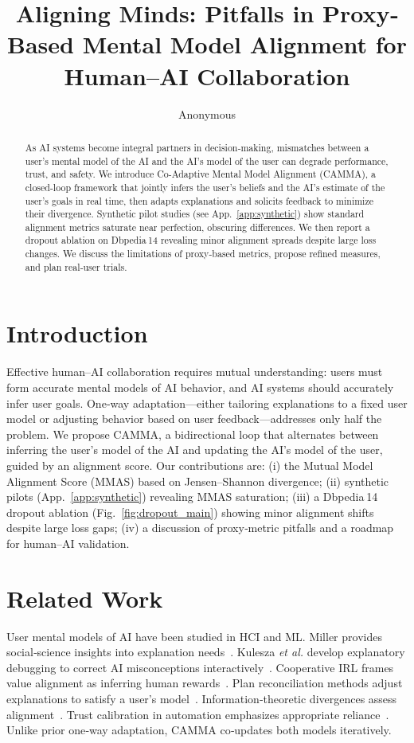 \documentclass{article}
\title{Aligning Minds: Pitfalls in Proxy‐Based Mental Model Alignment for Human–AI Collaboration}
\author{Anonymous}
\begin{document}
\maketitle

\begin{abstract}
As AI systems become integral partners in decision‐making, mismatches between a user's mental model of the AI and the AI's model of the user can degrade performance, trust, and safety. We introduce Co-Adaptive Mental Model Alignment (CAMMA), a closed-loop framework that jointly infers the user's beliefs and the AI's estimate of the user's goals in real time, then adapts explanations and solicits feedback to minimize their divergence. Synthetic pilot studies (see App.~\ref{app:synthetic}) show standard alignment metrics saturate near perfection, obscuring differences. We then report a dropout ablation on Dbpedia 14 revealing minor alignment spreads despite large loss changes. We discuss the limitations of proxy‐based metrics, propose refined measures, and plan real‐user trials.
\end{abstract}

\section{Introduction}
Effective human–AI collaboration requires mutual understanding: users must form accurate mental models of AI behavior, and AI systems should accurately infer user goals. One‐way adaptation—either tailoring explanations to a fixed user model or adjusting behavior based on user feedback—addresses only half the problem. We propose CAMMA, a bidirectional loop that alternates between inferring the user's model of the AI and updating the AI's model of the user, guided by an alignment score. Our contributions are: (i) the Mutual Model Alignment Score (MMAS) based on Jensen–Shannon divergence; (ii) synthetic pilots (App.~\ref{app:synthetic}) revealing MMAS saturation; (iii) a Dbpedia 14 dropout ablation (Fig.~\ref{fig:dropout_main}) showing minor alignment shifts despite large loss gaps; (iv) a discussion of proxy‐metric pitfalls and a roadmap for human–AI validation.

\section{Related Work}
User mental models of AI have been studied in HCI and ML. Miller provides social‐science insights into explanation needs~\citep{miller2017explanationia}. Kulesza \emph{et al.} develop explanatory debugging to correct AI misconceptions interactively~\citep{kulesza2015principlesoe}. Cooperative IRL frames value alignment as inferring human rewards~\citep{hadfield-menell2016cooperativeir}. Plan reconciliation methods adjust explanations to satisfy a user's model~\citep{ribeiro2016whysi}. Information‐theoretic divergences assess alignment~\citep{lin1991divergencemb}. Trust calibration in automation emphasizes appropriate reliance~\citep{lee2004trustia}. Unlike prior one‐way adaptation, CAMMA co‐updates both models iteratively.
\end{document}
